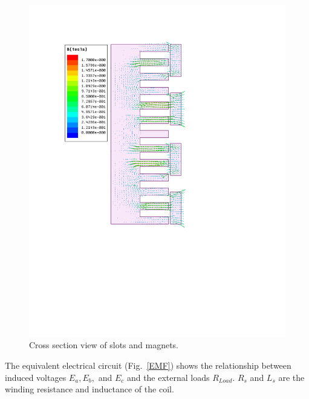 \documentclass[twocolumn,10pt]{asme2e}
\begin{document}
\begin{figure}[t]
    \centering
    \includegraphics[width=1\columnwidth]{Images/Slots_n_Magnets_Linear}
    \caption{Cross section view of slots and magnets.}
    \label{magnets}
    \end{figure} 

The equivalent electrical circuit (Fig.~\ref{EMF}) shows the relationship between induced voltages $E_a, E_b,$ and $E_c$ and the external loads $R_{Load}$. $R_s$ and $L_s$ are the winding resistance and inductance of the coil. 
\end{document}
